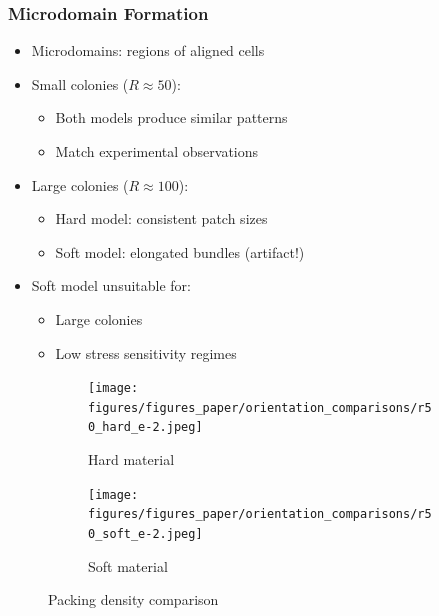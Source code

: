 \documentclass[
	10pt,
	t
]{beamer}
\begin{document}
\begin{frame}
    \frametitle{Microdomain Formation}

    \begin{itemize}
        \item Microdomains: regions of aligned cells
        \item Small colonies ($R \approx 50$):
              \begin{itemize}
                  \item Both models produce similar patterns
                  \item Match experimental observations
              \end{itemize}
        \item Large colonies ($R \approx 100$):
              \begin{itemize}
                  \item Hard model: consistent patch sizes
                  \item Soft model: elongated bundles (artifact!)
              \end{itemize}
        \item Soft model unsuitable for:
              \begin{itemize}
                  \item Large colonies
                  \item Low stress sensitivity regimes
              \end{itemize}
    \end{itemize}

    \begin{figure}[h!]
        \centering
        \begin{subfigure}[b]{0.48\textwidth}
            \centering
            \texttt{[image: figures/figures\_paper/orientation\_comparisons/r50\_hard\_e-2.jpeg]}
            \caption{\scriptsize{Hard material}}
        \end{subfigure}
        \hfill
        \begin{subfigure}[b]{0.48\textwidth}
            \centering
            \texttt{[image: figures/figures\_paper/orientation\_comparisons/r50\_soft\_e-2.jpeg]}
            \caption{\scriptsize{Soft material}}
        \end{subfigure}
        \caption{\scriptsize{Packing density comparison}}
    \end{figure}

\end{frame}
\end{document}
